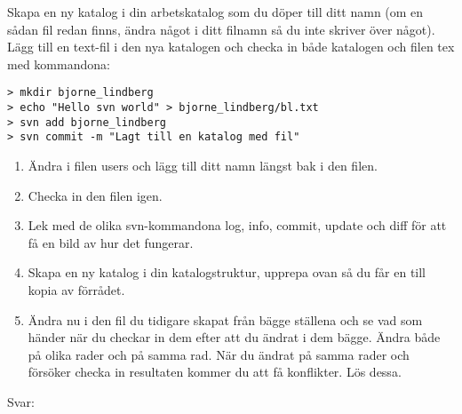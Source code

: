 \documentclass[10pt, a4paper]{article}
\begin{document}
Skapa en ny katalog i din arbetskatalog som du döper till ditt namn (om en sådan fil redan finns, ändra något i ditt filnamn så du inte skriver över något). Lägg till en text-fil i den nya katalogen och checka in både katalogen och filen tex med kommandona: 
\begin{verbatim}
> mkdir bjorne_lindberg
> echo "Hello svn world" > bjorne_lindberg/bl.txt
> svn add bjorne_lindberg
> svn commit -m "Lagt till en katalog med fil"
\end{verbatim}
\begin{enumerate}
\item Ändra i filen users och lägg till ditt namn längst bak i den filen. 
\item Checka in den filen igen.
\item Lek med de olika svn-kommandona log, info, commit, update och diff för att få en bild av hur det fungerar.
\item Skapa en ny katalog i din katalogstruktur, upprepa ovan så du får en till kopia av förrådet.
\item Ändra nu i den fil du tidigare skapat från bägge ställena och se vad som händer när du checkar in dem efter att du ändrat i dem bägge. Ändra både på olika rader och på samma rad. När du ändrat på samma rader och försöker checka in resultaten kommer du att få konflikter. Lös dessa.
\end{enumerate}
\vspace{10pt}
Svar:
\end{document}
